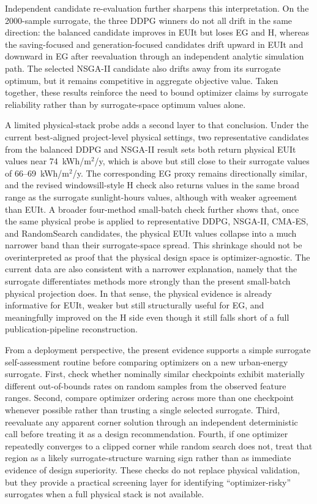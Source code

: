 \documentclass[final,3p,times]{elsarticle}
\begin{document}
Independent candidate re-evaluation further sharpens this interpretation. On the 2000-sample surrogate, the three DDPG winners do not all drift in the same direction: the balanced candidate improves in EUIt but loses EG and H, whereas the saving-focused and generation-focused candidates drift upward in EUIt and downward in EG after reevaluation through an independent analytic simulation path. The selected NSGA-II candidate also drifts away from its surrogate optimum, but it remains competitive in aggregate objective value. Taken together, these results reinforce the need to bound optimizer claims by surrogate reliability rather than by surrogate-space optimum values alone.

A limited physical-stack probe adds a second layer to that conclusion. Under the current best-aligned project-level physical settings, two representative candidates from the balanced DDPG and NSGA-II result sets both return physical EUIt values near 74~kWh/m$^2$/y, which is above but still close to their surrogate values of 66--69~kWh/m$^2$/y. The corresponding EG proxy remains directionally similar, and the revised windowsill-style H check also returns values in the same broad range as the surrogate sunlight-hours values, although with weaker agreement than EUIt. A broader four-method small-batch check further shows that, once the same physical probe is applied to representative DDPG, NSGA-II, CMA-ES, and RandomSearch candidates, the physical EUIt values collapse into a much narrower band than their surrogate-space spread. This shrinkage should not be overinterpreted as proof that the physical design space is optimizer-agnostic. The current data are also consistent with a narrower explanation, namely that the surrogate differentiates methods more strongly than the present small-batch physical projection does. In that sense, the physical evidence is already informative for EUIt, weaker but still structurally useful for EG, and meaningfully improved on the H side even though it still falls short of a full publication-pipeline reconstruction.

From a deployment perspective, the present evidence supports a simple surrogate self-assessment routine before comparing optimizers on a new urban-energy surrogate. First, check whether nominally similar checkpoints exhibit materially different out-of-bounds rates on random samples from the observed feature ranges. Second, compare optimizer ordering across more than one checkpoint whenever possible rather than trusting a single selected surrogate. Third, reevaluate any apparent corner solution through an independent deterministic call before treating it as a design recommendation. Fourth, if one optimizer repeatedly converges to a clipped corner while random search does not, treat that region as a likely surrogate-structure warning sign rather than as immediate evidence of design superiority. These checks do not replace physical validation, but they provide a practical screening layer for identifying ``optimizer-risky'' surrogates when a full physical stack is not available.
\end{document}
